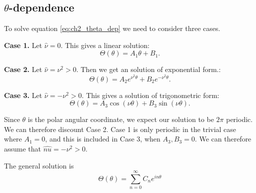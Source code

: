 \subsection{\texorpdfstring{$\theta$}{theta}-dependence}
To solve equation \eqref{eq:ch2_theta_dep} we need to consider three cases. \par
%
\textbf{Case 1.} Let $\hat{\nu} = 0$. This gives a linear solution:
    \begin{equation}
        \Theta(\theta) = A_1 \theta + B_1.
    \end{equation}\par
%
\textbf{Case 2.} Let $\hat{\nu} = \nu^2 > 0.$ Then we get an solution of exponential form.:
    \begin{equation}
        \Theta(\theta) = A_2 e^{\nu^2 \theta} + B_2 e^{- \nu^2 \theta}.
    \end{equation}\par
%
\textbf{Case 3.} Let $\hat{\nu}= - \nu^2 > 0$. This gives a solution of trigonometric form:
    \begin{equation}
        \Theta(\theta) = A_3 \cos(\nu\theta) + B_3 \sin(\nu\theta). 
    \end{equation}\par
%
Since $\theta$ is the polar angular coordinate, we expect our solution to be $2\pi$ periodic. We can therefore discount Case 2. Case 1 is only periodic in the trivial case where $A_1 = 0$, and this is included in Case 3, when $A_3, B_3 = 0.$ We can therefore assume that $\hat{nu} = - \nu^2 > 0$.
%
    \begin{propn} The general solution is
        \begin{equation}
            \Theta(\theta) = \sum^\infty_{n=0} C_n e^{in\theta}
        \end{equation} 
    \end{propn}
%
